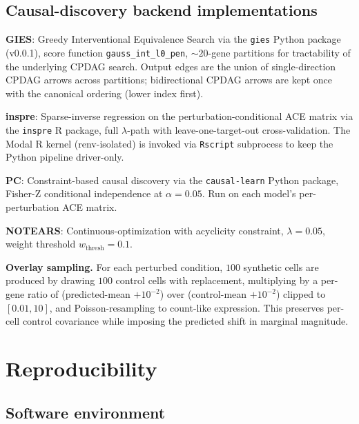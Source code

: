 \documentclass{article}
\begin{document}
\subsection{Causal-discovery backend implementations}
\label{app:cd_backends}

\textbf{GIES}: Greedy Interventional Equivalence Search via the \texttt{gies} Python package (v0.0.1), score function \texttt{gauss\_int\_l0\_pen}, ${\sim}20$-gene partitions for tractability of the underlying CPDAG search. Output edges are the union of single-direction CPDAG arrows across partitions; bidirectional CPDAG arrows are kept once with the canonical ordering (lower index first).

\textbf{inspre}: Sparse-inverse regression on the perturbation-conditional ACE matrix via the \texttt{inspre} R package, full $\lambda$-path with leave-one-target-out cross-validation. The Modal R kernel (renv-isolated) is invoked via \texttt{Rscript} subprocess to keep the Python pipeline driver-only.

\textbf{PC}: Constraint-based causal discovery via the \texttt{causal-learn} Python package, Fisher-Z conditional independence at $\alpha = 0.05$. Run on each model's per-perturbation ACE matrix.

\textbf{NOTEARS}: Continuous-optimization with acyclicity constraint, $\lambda = 0.05$, weight threshold $w_{\mathrm{thresh}} = 0.1$.

\textbf{Overlay sampling.} For each perturbed condition, $100$ synthetic cells are produced by drawing $100$ control cells with replacement, multiplying by a per-gene ratio of (predicted-mean $+ 10^{-2}$) over (control-mean $+ 10^{-2}$) clipped to $[0.01, 10]$, and Poisson-resampling to count-like expression. This preserves per-cell control covariance while imposing the predicted shift in marginal magnitude.

\section{Reproducibility}
\label{app:reproducibility}

\subsection{Software environment}
\label{app:software}
\end{document}
